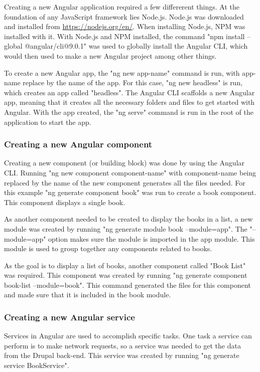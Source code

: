 Creating a new Angular application required a few differerent things. At the foundation of any JavaScript framework lies \gls{Node.js}. Node.js was downloaded and installed from \url{https://nodejs.org/en/}. When installing Node.js, \gls{NPM} was installed with it. With Node.js and NPM installed, the command "npm install --global @angular/cli@9.0.1" was used to globally install the Angular CLI, which would then used to make a new Angular project among other things.

To create a new Angular app, the "ng new {app-name}" command is run, with {app-name} replace by the name of the app. For this case, "ng new headless" is run, which creates an app called "headless". The Angular CLI scaffolds a new Angular app, meaning that it creates all the necessary folders and files to get started with Angular. With the app created, the "ng serve" command is run in the root of the application to start the app.


\subsubsection{Creating a new Angular component}

Creating a new component (or building block) was done by using the Angular CLI. Running "ng new component {component-name}" with {component-name} being replaced by the name of the new component generates all the files needed. For this example "ng generate component book" was run to create a book component. This component displays a single book. 

As another component needed to be created to display the books in a list, a new module was created by running "ng generate module book --module=app". The "--module=app" option makes sure the module is imported in the app module. This module is used to group together any components related to books.

As the goal is to display a list of books, another component called "Book List" was required. This component was created by running "ng generate component book-list --module=book". This command generated the files for this component and made sure that it is included in the book module.

\subsubsection{Creating a new Angular service}

Services in Angular are used to accomplish specific tasks. One task a service can perform is to make network requests, so a service was needed to get the data from the Drupal back-end. This service was created by running "ng generate service BookService".

